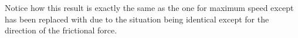 \begin{problem}
{\begin{enumerate}
\begin{enumerate}
Notice how this result is exactly the same as the one for maximum speed except \vari{\mu} has been replaced with \vari{-\mu} due to the situation being identical except for the direction of the frictional force. 
\end{enumerate}
\end{enumerate}
}
\end{problem}